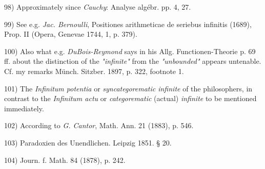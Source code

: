 \vspace{-0.1cm}
\leftline{\rule{2in}{0.4pt}}
\vspace{0.2cm}
{
\footnotesize
98) Approximately since \textit{Cauchy}: Analyse algébr. pp. 4, 27.

99) See e.g. \textit{Jac. Bernoulli}, Positiones arithmeticae de seriebus infinitis (1689), Prop. II (Opera, Genevae 1744, 1, p. 379).

100) Also what e.g. \textit{DuBois-Reymond} says in his Allg. Functionen-Theorie p. 69 ff. about the distinction of the \textit{"infinite"} from the \textit{"unbounded"} appears untenable. Cf. my remarks Münch. Sitzber. 1897, p. 322, footnote 1.

101) The \textit{Infinitum potentia} or \textit{syncategorematic infinite} of the philosophers, in contrast to the \textit{Infinitum actu} or \textit{categorematic} (actual) \textit{infinite} to be mentioned immediately.

102) According to \textit{G. Cantor}, Math. Ann. 21 (1883), p. 546.

103) Paradoxien des Unendlichen. Leipzig 1851. § 20.

104) Journ. f. Math. 84 (1878), p. 242.

}